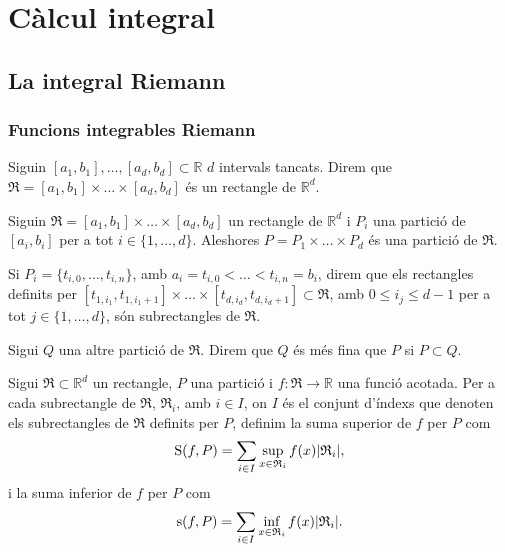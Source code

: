 \documentclass[../Apunts.tex]{subfiles}
\begin{document}
	\chapter{Càlcul integral}
	\section{La integral Riemann}
	\subsection{Funcions integrables Riemann}
	\begin{definition}[Rectangle]
		\label{def:Rectangle}
		Siguin \([a_{1},b_{1}],\dots,[a_{d},b_{d}]\subset\mathbb{R}\) \(d\) intervals tancats. Direm que \(\mathfrak{R}=[a_{1},b_{1}]\times\dots\times[a_{d},b_{d}]\) és un rectangle de \(\mathbb{R}^{d}\).
	\end{definition}
	\begin{definition}
		\label{def:Partició d'un rectangle}
		\label{def:finor d'una partició}
		Siguin \(\mathfrak{R}=[a_{1},b_{1}]\times\dots\times[a_{d},b_{d}]\) un rectangle de \(\mathbb{R}^{d}\) i \(P_{i}\) una partició de \([a_{i},b_{i}]\) per a tot \(i\in\{1,\dots,d\}\). Aleshores \(P=P_{1}\times\dots\times P_{d}\) és una partició de \(\mathfrak{R}\).
		
		Si \(P_{i}=\{t_{i,0},\dots,t_{i,n}\}\), amb \(a_{i}=t_{i,0}<\dots<t_{i,n}=b_{i}\), direm que els rectangles definits per \([t_{1,i_{1}},t_{1,i_{1}+1}]\times\dots\times[t_{d,i_{d}},t_{d,i_{d}+1}]\subset \mathfrak{R}\), amb \(0\leq i_{j}\leq d-1\) per a tot \(j\in\{1,\dots,d\}\), són subrectangles de \(\mathfrak{R}\).
		
		Sigui \(Q\) una altre partició de \(\mathfrak{R}\). Direm que \(Q\) és més fina que \(P\) si \(P\subset Q\).
	\end{definition}
	\begin{definition}
		\label{def:Suma superior i inferior}
		Sigui \(\mathfrak{R}\subset\mathbb{R}^{d}\) un rectangle, \(P\) una partició i \(f\colon\mathfrak{R}\to\mathbb{R}\) una funció acotada. Per a cada subrectangle de \(\mathfrak{R}\), \(\mathfrak{R}_{i}\), amb \(i\in I\), on \(I\) és el conjunt d'índexs que denoten els subrectangles de \(\mathfrak{R}\) definits per \(P\), definim la suma superior de \(f\) per \(P\) com
		\[\Ssup(f,P)=\sum_{i\in I}\sup_{x\in \mathfrak{R}_{i}}f(x)\abs{\mathfrak{R}_{i}},\]
		i la suma inferior de \(f\) per \(P\) com
		\[\sinf(f,P)=\sum_{i\in I}\inf_{x\in \mathfrak{R}_{i}}f(x)\abs{\mathfrak{R}_{i}}.\]
	\end{definition}
\end{document}

